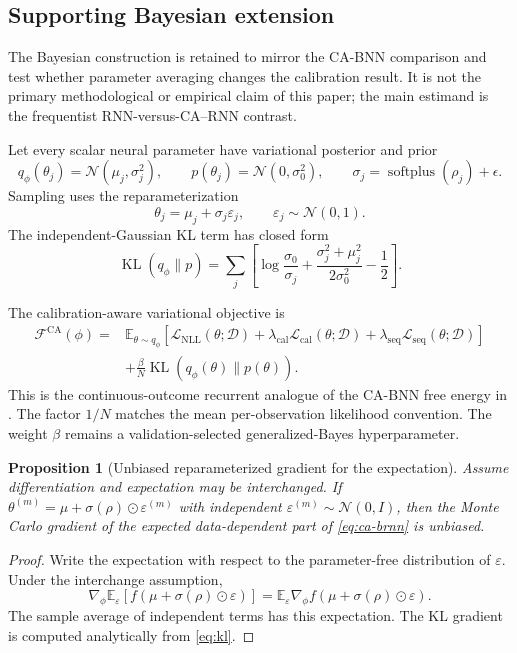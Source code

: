 \documentclass[11pt]{article}
\newtheorem{proposition}[definition]{Proposition}
\newcommand{\E}{\mathbb{E}}
\newcommand{\D}{\mathcal{D}}
\newcommand{\N}{\mathcal{N}}
\newcommand{\KL}{\operatorname{KL}}
\newcommand{\CA}{\mathrm{CA}}
\begin{document}
\subsection{Supporting Bayesian extension}

The Bayesian construction is retained to mirror the CA-BNN comparison and test
whether parameter averaging changes the calibration result. It is not the
primary methodological or empirical claim of this paper; the main estimand is
the frequentist RNN-versus-CA--RNN contrast.

Let every scalar neural parameter have variational posterior and prior
\[
q_\phi(\theta_j)=\N(\mu_j,\sigma_j^2),
\qquad
p(\theta_j)=\N(0,\sigma_0^2),
\qquad
\sigma_j=\operatorname{softplus}(\rho_j)+\epsilon.
\]
Sampling uses the reparameterization
\[
\theta_j=\mu_j+\sigma_j\varepsilon_j,
\qquad \varepsilon_j\sim\N(0,1).
\]
The independent-Gaussian KL term has closed form
\begin{equation}
\KL(q_\phi\|p)
=\sum_j\left[
\log\frac{\sigma_0}{\sigma_j}
+\frac{\sigma_j^2+\mu_j^2}{2\sigma_0^2}-\frac12
\right].
\label{eq:kl}
\end{equation}

The calibration-aware variational objective is
\begin{align}
\mathcal F^{\CA}(\phi)
={}&\E_{\theta\sim q_\phi}\left[
\mathcal L_{\mathrm{NLL}}(\theta;\D)
+\lambda_{\mathrm{cal}}\mathcal L_{\mathrm{cal}}(\theta;\D)
+\lambda_{\mathrm{seq}}\mathcal L_{\mathrm{seq}}(\theta;\D)
\right]\\
&+\frac{\beta}{N}\KL(q_\phi(\theta)\|p(\theta)).
\label{eq:ca-brnn}
\end{align}
This is the continuous-outcome recurrent analogue of the CA-BNN free energy in
\cite{huang2024cabl}. The factor $1/N$ matches the mean per-observation likelihood
convention. The weight $\beta$ remains a validation-selected generalized-Bayes
hyperparameter.

\begin{proposition}[Unbiased reparameterized gradient for the expectation]
Assume differentiation and expectation may be interchanged. If
$\theta^{(m)}=\mu+\sigma(\rho)\odot\varepsilon^{(m)}$ with independent
$\varepsilon^{(m)}\sim\N(0,I)$, then the Monte Carlo gradient of the expected
data-dependent part of \eqref{eq:ca-brnn} is unbiased.
\end{proposition}

\begin{proof}
Write the expectation with respect to the parameter-free distribution of
$\varepsilon$. Under the interchange assumption,
\[
\nabla_\phi\E_\varepsilon[f(\mu+\sigma(\rho)\odot\varepsilon)]
=\E_\varepsilon\nabla_\phi f(\mu+\sigma(\rho)\odot\varepsilon).
\]
The sample average of independent terms has this expectation. The KL gradient is
computed analytically from \eqref{eq:kl}.
\end{proof}
\end{document}
